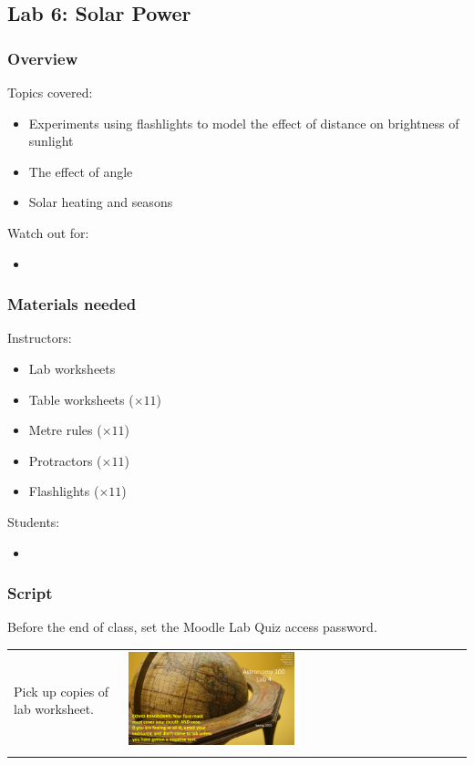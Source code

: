 \documentclass[12pt]{article}
\begin{document}
\newpage
\subsection{Lab 6: Solar Power}

\subsubsection{Overview}

Topics covered:
\begin{itemize}
\item Experiments using flashlights to model the effect of distance on brightness of sunlight
\item The effect of angle
\item Solar heating and seasons
\end{itemize}

\noindent
Watch out for:
\begin{itemize}
\item 
\end{itemize}


\subsubsection{Materials needed}

Instructors:
\begin{itemize}
\item Lab worksheets
\item Table worksheets ($\times 11$)
\item Metre rules ($\times 11$)
\item Protractors ($\times 11$)
\item Flashlights ($\times 11$)
\end{itemize}

\noindent
Students:
\begin{itemize}
\item 
\end{itemize}


\subsubsection{Script}

Before the end of class, set the Moodle Lab Quiz access password.

\begin{longtable}{m{}m{}}
Pick up copies of lab worksheet. & \includegraphics[width=0.5\textwidth]{ppt/lab06/Slide1.jpeg}\\

\label{default}
\end{longtable}
\end{document}
